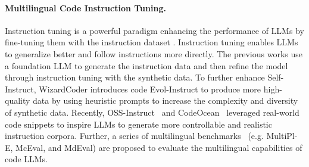 \paragraph{Multilingual Code Instruction Tuning.} 
Instruction tuning is a powerful paradigm enhancing the performance of LLMs by fine-tuning them with the instruction dataset \cite{instructGPT,llama_adapter,self_instructions}. Instruction tuning enables LLMs to generalize better and follow instructions more directly. The previous works \cite{self_instructions,codealpaca} use a foundation LLM to generate the instruction data and then refine the model through instruction tuning with the synthetic data. To further enhance Self-Instruct, WizardCoder \cite{wizardcoder} introduces code Evol-Instruct to produce more high-quality data by using heuristic prompts to increase the complexity and diversity of synthetic data. Recently, OSS-Instruct~\cite{magicoder} and CodeOcean~\cite{wavecoder} leveraged real-world code snippets to inspire LLMs to generate more controllable and realistic instruction corpora. Further, a series of multilingual benchmarks~\cite{multipl_e,mceval,mdeval,fullstack,bigcodebench} (e.g. MultiPl-E, McEval, and MdEval) are proposed to evaluate the multilingual capabilities of code LLMs.